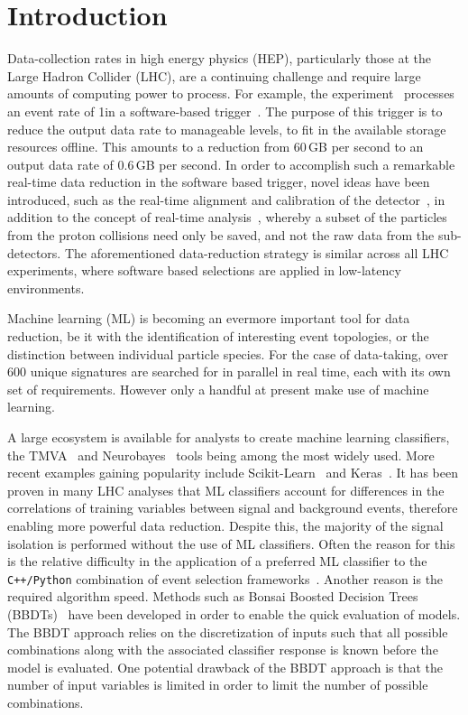 \section{Introduction}
\label{sec:intro}

Data-collection rates in high energy physics (HEP), particularly those at the Large Hadron Collider (LHC),
are a continuing challenge and require large amounts of computing power to process.
For example, the \lhcb experiment~\cite{Alves:2008zz} processes an event rate of 1\mhz in a software-based 
trigger~\cite{LHCb-DP-2014-002}. The purpose of this trigger is to reduce the output
data rate to manageable levels, \ie to fit in the available storage resources offline.
This amounts to a reduction from 60\,GB per second to an output data rate of 0.6\,GB per second. 
In order to accomplish such a remarkable real-time data reduction in the software based trigger,
novel ideas have been introduced, such as the real-time alignment and calibration of the detector~\cite{Xu:2016mik},
in addition to the concept of real-time analysis~\cite{Aaij:2016rxn}, whereby a subset of the particles from the proton collisions need only
be saved, and not the raw data from the sub-detectors.
The aforementioned data-reduction strategy is similar across all LHC experiments, where
software based selections are applied in low-latency environments.

Machine learning (ML) is becoming an evermore important tool for data reduction,
be it with the identification of interesting event topologies, or the distinction
between individual particle species. For the case of \lhcb data-taking, over 600
unique signatures are searched for in parallel in real time, each with its own set of requirements.
However only a handful at present make use of machine learning.

A large ecosystem is available for analysts to create machine learning classifiers,
the TMVA~\cite{Hocker:2007ht} and Neurobayes~\cite{Feindt:2006pm} tools being among the most widely used.
More recent examples gaining popularity include Scikit-Learn~\cite{Pedregosa:2012toh}
and Keras~\cite{keras}. It has been proven in many LHC analyses that
ML classifiers account for differences in the correlations of
training variables between signal and background events, therefore enabling more
powerful data reduction.
Despite this, the majority of the signal isolation is performed
without the use of ML classifiers. Often the reason for this is the relative difficulty in
the application of a preferred ML classifier to the {\tt C++/Python} combination
of event selection frameworks~\cite{Barrand:2001ny}. Another 
reason is the required algorithm speed. Methods such as Bonsai
Boosted Decision Trees (BBDTs)~\cite{Gligorov:2012qt} have been developed in order
to enable the quick evaluation of models. The BBDT approach relies on the 
discretization of inputs such that all possible combinations along with
the associated classifier response is known before the model is evaluated.
One potential drawback of the BBDT approach is that the number of input variables is limited
in order to limit the number of possible combinations. 

